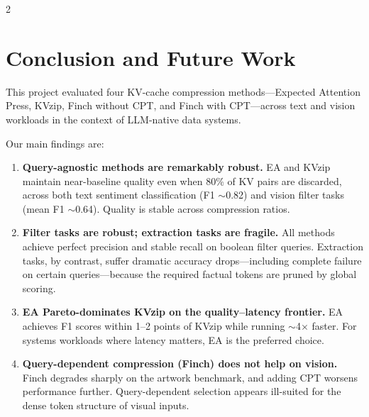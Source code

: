 \documentclass[10pt,a4paper]{article}
\begin{document}
\begin{multicols}{2}
\section{Conclusion and Future Work}

This project evaluated four KV-cache compression methods---Expected
Attention Press, KVzip, Finch without CPT, and Finch with CPT---across
text and vision workloads in the context of LLM-native data systems.

Our main findings are:
\begin{enumerate}
  \item \textbf{Query-agnostic methods are remarkably robust.} EA and
    KVzip maintain near-baseline quality even when 80\% of KV pairs are
    discarded, across both text sentiment classification (F1 $\sim$0.82)
    and vision filter tasks (mean F1 $\sim$0.64). Quality is stable
    across compression ratios.
  \item \textbf{Filter tasks are robust; extraction tasks are fragile.}
    All methods achieve perfect precision and stable recall on boolean
    filter queries. Extraction tasks, by contrast, suffer dramatic
    accuracy drops---including complete failure on certain
    queries---because the required factual tokens are pruned by global
    scoring.
  \item \textbf{EA Pareto-dominates KVzip on the quality--latency
    frontier.} EA achieves F1 scores within 1--2 points of KVzip while
    running $\sim$4$\times$ faster. For systems workloads where latency
    matters, EA is the preferred choice.
  \item \textbf{Query-dependent compression (Finch) does not help on
    vision.} Finch degrades sharply on the artwork benchmark, and adding
    CPT worsens performance further. Query-dependent selection appears
    ill-suited for the dense token structure of visual inputs.
\end{enumerate}


\end{multicols}
\end{document}

